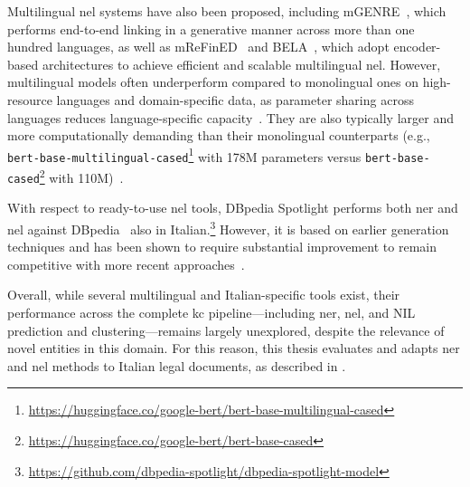 Multilingual \ac{nel} systems have also been proposed, including mGENRE~\cite{de-cao-etal-2022-multilingual}, which performs end-to-end linking in a generative manner across more than one hundred languages, as well as mReFinED~\cite{limkonchotiwat-etal-2023-mrefined} and BELA~\cite{plekhanov2023multilingualendendentity}, which adopt encoder-based architectures to achieve efficient and scalable multilingual \ac{nel}.
However, multilingual models often underperform compared to monolingual ones on high-resource languages and domain-specific data, as parameter sharing across languages reduces language-specific capacity~\cite{wu-dredze-2020-languages,virtanen2019multilingualenoughbertfinnish}. They are also typically larger and more computationally demanding than their monolingual counterparts (e.g., \texttt{bert-base-multilingual-cased}\footnote{\url{https://huggingface.co/google-bert/bert-base-multilingual-cased}} with 178M parameters versus \texttt{bert-base-cased}\footnote{\url{https://huggingface.co/google-bert/bert-base-cased}} with 110M)~\cite{devlin-etal-2019-bert}.


With respect to ready-to-use \ac{nel} tools, DBpedia Spotlight performs both \ac{ner} and \ac{nel} against DBpedia~\cite{mendes_2011_spotlight,Daiber2013spotlight} also in Italian.\footnote{\url{https://github.com/dbpedia-spotlight/dbpedia-spotlight-model}} However, it is based on earlier generation techniques and has been shown to require substantial improvement to remain competitive with more recent approaches~\cite{ficlone}.

Overall, while several multilingual and Italian-specific tools exist, their performance across the complete \acl{kc} pipeline---including \ac{ner}, \ac{nel}, and NIL prediction and clustering---remains largely unexplored, despite the relevance of novel entities in this domain. For this reason, this thesis evaluates and adapts \ac{ner} and \ac{nel} methods to Italian legal documents, as described in .